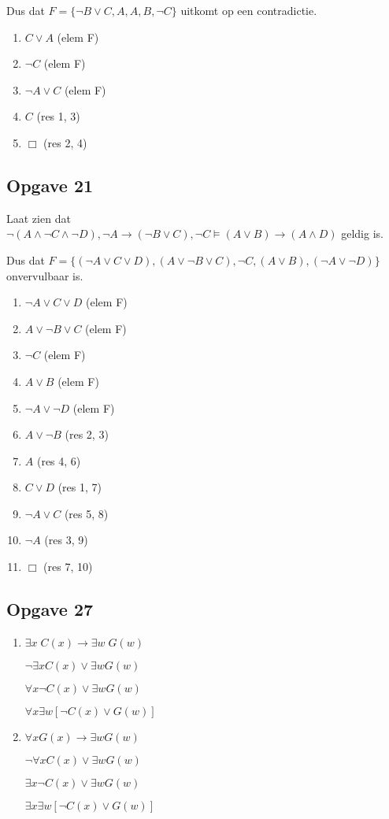 \documentclass[11pt]{article}
\newcommand{\E}{\exists}
\newcommand{\A}{\forall}
\begin{document}
Dus dat $F = \{\neg B \vee C, A, A, B, \neg C\}$
uitkomt op een contradictie.

\begin{enumerate}
  \item $C \vee A$ (elem F)
  \item $\neg C$ (elem F)
  \item $\neg A \vee C$ (elem F)
  \item $C$ (res 1, 3)
  \item $\Box$ (res 2, 4)
\end{enumerate}


\subsection*{Opgave 21}
Laat zien dat $\neg (A \wedge \neg C \wedge \neg D), \neg A \rightarrow (\neg B
\vee C),\neg C \models (A \vee B) \rightarrow (A \wedge D)$ geldig is.

Dus dat $F =\{(\neg A \vee C \vee D), (A \vee \neg B \vee C),\neg C,
(A \vee B), (\neg A \vee \neg D)\}$ onvervulbaar is.


\begin{enumerate}
  \item $\neg A \vee C \vee D$ (elem F)
  \item $A \vee \neg B \vee C$ (elem F)
  \item $\neg C$ (elem F)
  \item $A \vee B$ (elem F)
  \item $\neg A \vee \neg D$ (elem F)
  \item $A \vee \neg B$ (res 2, 3)
  \item $A$ (res 4, 6)
  \item $C \vee D$ (res 1, 7)
  \item $\neg A \vee C$ (res 5, 8)
  \item $\neg A$ (res 3, 9)
  \item $\Box$ (res 7, 10)
\end{enumerate}


\subsection*{Opgave 27}
\begin{enumerate}[label=\alph*]
  \item $\E x\; C(x) \rightarrow \E w\; G(w)$

  $\neg \E x C(x) \vee \E w G(w)$

  $\A x \neg C(x) \vee \E w G(w)$

  $\A x \E w [\neg C(x) \vee G(w)]$

  \item $\A x G(x) \rightarrow \E w G(w)$

  $\neg \A x C(x) \vee \E w G(w)$

  $\E x \neg C(x) \vee \E w G(w)$

  $\E x \E w [\neg C(x) \vee G(w)]$
\end{enumerate}
\end{document}
